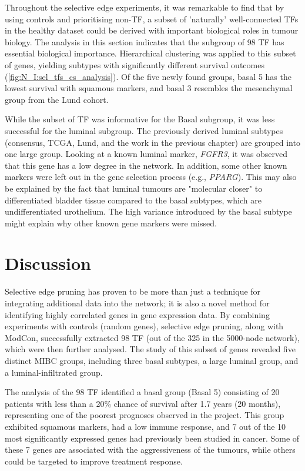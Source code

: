 Throughout the selective edge experiments, it was remarkable to find that by using controls and prioritising non-TF, a subset of 'naturally' well-connected TFs in the healthy dataset could be derived with important biological roles in tumour biology. The analysis in this section indicates that the subgroup of 98 TF has essential biological importance. Hierarchical clustering was applied to this subset of genes, yielding subtypes with significantly different survival outcomes (\cref{fig:N_I:sel_tfs_cs_analysis}). Of the five newly found groups, basal 5 has the lowest survival with squamous markers, and basal 3 resembles the mesenchymal group from the Lund cohort.

While the subset of TF was informative for the Basal subgroup, it was less successful for the luminal subgroup. The previously derived luminal subtypes (consensus, TCGA, Lund, and the work in the previous chapter) are grouped into one large group. Looking at a known luminal marker, \textit{FGFR3}, it was observed that this gene has a low degree in the network. In addition, some other known markers were left out in the gene selection process (e.g., \textit{PPARG}). This may also be explained by the fact that luminal tumours are "molecular closer" to differentiated bladder tissue compared to the basal subtypes, which are undifferentiated urothelium. The high variance introduced by the basal subtype might explain why other known gene markers were missed.

\section{Discussion}

Selective edge pruning has proven to be more than just a technique for integrating additional data into the network; it is also a novel method for identifying highly correlated genes in gene expression data. By combining experiments with controls (random genes), selective edge pruning, along with ModCon, successfully extracted 98 TF (out of the 325 in the 5000-node network), which were then further analysed. The study of this subset of genes revealed five distinct MIBC groups, including three basal subtypes, a large luminal group, and a luminal-infiltrated group.

The analysis of the 98 TF identified a basal group (Basal 5) consisting of 20 patients with less than a 20\% chance of survival after 1.7 years (20 months), representing one of the poorest prognoses observed in the project. This group exhibited squamous markers, had a low immune response, and 7 out of the 10 most significantly expressed genes had previously been studied in cancer. Some of these 7 genes are associated with the aggressiveness of the tumours, while others could be targeted to improve treatment response.

